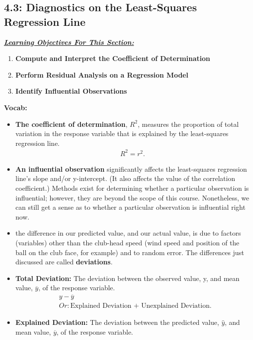 \documentclass{report}
\begin{document}
    \subsection{4.3: Diagnostics on the Least-Squares Regression Line}
    \bigbreak \noindent 
    \textbf{\textit{\underline{Learning Objectives For This Section:}}}
    \begin{enumerate}
        \item \textbf{Compute and Interpret the Coefficient of Determination}
        \item \textbf{Perform Residual Analysis on a Regression Model}
        \item \textbf{Identify Influential Observations}
    \end{enumerate}
    \textbf{Vocab:}
    \begin{itemize}
        \item \textbf{The coefficient of determination}, $R^{2}$, measures the proportion of total variation in the response variable that is explained by the least-squares regression line.
            \begin{align*}
                R^{2} = r^{2}
            .\end{align*}
        \item \textbf{An influential observation} significantly affects the least-squares regression line's slope and/or y-intercept. (It also affects the value of the correlation coefficient.) Methods exist for determining whether a particular observation is influential; however, they are beyond the scope of this course. Nonetheless, we can still get a sense as to whether a particular observation is influential right now.
        \item the difference in our predicted value, and our actual value, is due to factors (variables) other than the club-head speed (wind speed and position of the ball on the club face, for example) and to random error. The differences just discussed are called \textbf{deviations}.
        \item \textbf{Total Deviation:} The deviation between the observed value, y, and mean value, $\overline{y} $, of the response variable.
            \begin{align*}
                &y - \overline{y} \\
                &Or: \text{Explained Deviation + Unexplained Deviation}
            .\end{align*}
        \item \textbf{Explained Deviation:} The deviation between the predicted value, $\hat{y} $, and mean value, $\overline{y} $, of the response variable.

\end{itemize}
\end{document}
